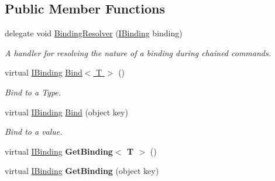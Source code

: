 \subsection*{Public Member Functions}
\begin{DoxyCompactItemize}
\item 
\hypertarget{classbabel_1_1framework_1_1impl_1_1_binder_a6c7c198f8fe3132d7985e9dd6d6d9780}{delegate void \hyperlink{classbabel_1_1framework_1_1impl_1_1_binder_a6c7c198f8fe3132d7985e9dd6d6d9780}{Binding\-Resolver} (\hyperlink{interfacebabel_1_1framework_1_1api_1_1_i_binding}{I\-Binding} binding)}\label{classbabel_1_1framework_1_1impl_1_1_binder_a6c7c198f8fe3132d7985e9dd6d6d9780}

\begin{DoxyCompactList}\small\item\em A handler for resolving the nature of a binding during chained commands. \end{DoxyCompactList}\item 
virtual \hyperlink{interfacebabel_1_1framework_1_1api_1_1_i_binding}{I\-Binding} \hyperlink{classbabel_1_1framework_1_1impl_1_1_binder_a7da3290fa54dfefbdcb432cf45e801eb}{Bind$<$ T $>$} ()
\begin{DoxyCompactList}\small\item\em Bind to a Type. \end{DoxyCompactList}\item 
\hypertarget{classbabel_1_1framework_1_1impl_1_1_binder_aebd8e548c4d517b361bd98c187863d81}{virtual \hyperlink{interfacebabel_1_1framework_1_1api_1_1_i_binding}{I\-Binding} \hyperlink{classbabel_1_1framework_1_1impl_1_1_binder_aebd8e548c4d517b361bd98c187863d81}{Bind} (object key)}\label{classbabel_1_1framework_1_1impl_1_1_binder_aebd8e548c4d517b361bd98c187863d81}

\begin{DoxyCompactList}\small\item\em Bind to a value. \end{DoxyCompactList}\item 
\hypertarget{classbabel_1_1framework_1_1impl_1_1_binder_a5ecb57da304cfa13f22000da467a05ab}{virtual \hyperlink{interfacebabel_1_1framework_1_1api_1_1_i_binding}{I\-Binding} {\bfseries Get\-Binding$<$ T $>$} ()}\label{classbabel_1_1framework_1_1impl_1_1_binder_a5ecb57da304cfa13f22000da467a05ab}

\item 
\hypertarget{classbabel_1_1framework_1_1impl_1_1_binder_a62d9ede414c6d03b989730c8220a782f}{virtual \hyperlink{interfacebabel_1_1framework_1_1api_1_1_i_binding}{I\-Binding} {\bfseries Get\-Binding} (object key)}\label{classbabel_1_1framework_1_1impl_1_1_binder_a62d9ede414c6d03b989730c8220a782f}


\end{DoxyCompactItemize}
